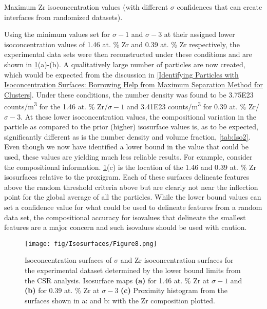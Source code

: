 		\begin{table}[]
			\caption{Maximum Zr isoconcentration values (with different $\sigma${} confidences that can create interfaces from randomized datasets).}
			
			\label{tab:Iso4}
		\end{table}
		
		Using the minimum values set for $\sigma-1${} and $\sigma-3${} at their assigned lower isoconcentration values of 1.46 at. \% Zr and 0.39 at. \% Zr respectively, the experimental data sets were then reconstructed under these conditions and are shown in \ref{fig:Iso8}(a)-(b). A qualitatively large number of particles are now created, which would be expected from the discussion in \ref{Identifying Particles with Isoconcentration Surfaces: Borrowing Help from Maximum Separation Method for Clusters}. Under these conditions, the number density was found to be 3.75E23 counts/m\textsuperscript{3} for the 1.46 at. \% Zr/$\sigma-1${} and 3.41E23 counts/m\textsuperscript{3} for 0.39 at. \% Zr/$\sigma-3${}. At these lower isoconcentration values, the compositional variation in the particle as compared to the prior (higher) isosurface values is, as to be expected, significantly different as is the number density and volume fraction, \ref{tab:Iso2}. Even though we now have identified a lower bound in the value that could be used, these values are yielding much less reliable results. For example, consider the compositional information. \ref{fig:Iso8}(c) is the location of the 1.46 and 0.39 at. \% Zr isosurfaces relative to the proxigram. Each of these surfaces delineate features above the random threshold criteria above but are clearly not near the inflection point for the global average of all the particles. While the lower bound values can set a confidence value for what could be used to delineate features from a random data set, the compositional accuracy for isovalues that delineate the smallest features are a major concern and such isovalues should be used with caution. 
		
		\begin{figure}
			\centering
			\texttt{[image: fig/Isosurfaces/Figure8.png]}
			\caption[Isoconcentration surfaces of $\sigma${} and Zr isoconcentration surfaces for the experimental dataset determined by the lower bound limits from the CSR analysis.]{Isoconcentration surfaces of $\sigma${} and Zr isoconcentration surfaces for the experimental dataset determined by the lower bound limits from the CSR analysis.
				Isosurface maps \textbf{(a)} for 1.46 at. \% Zr at $\sigma-1${} and \textbf{(b)} for 0.39 at. \% Zr at $\sigma-3${} \textbf{(c)}
				Proximity histogram from the surfaces shown in a: and b: with the Zr composition plotted.}
			\label{fig:Iso8}
		\end{figure}

